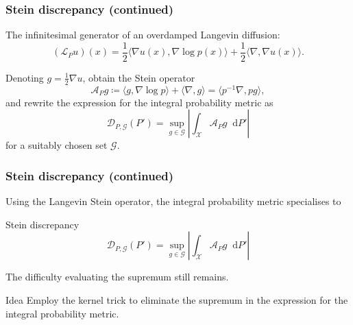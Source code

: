 \documentclass{beamer}
\newcommand*\diff{\mathop{}\!\mathrm{d}}
\begin{document}
\begin{frame}
\frametitle{Stein discrepancy (continued)}

The infinitesimal generator of an overdamped Langevin diffusion:
$$(\mathcal{L}_P u)(x) = \frac{1}{2} \langle \nabla u(x), \nabla \log p(x)\rangle + \frac{1}{2}\langle \nabla, \nabla u(x) \rangle.$$

Denoting $g  = \frac{1}{2}\nabla u$, \cite{gorhamMeasuringSampleQuality2015} obtain the Stein operator
\begin{equation*}
\mathcal{A}_P g \coloneq \langle g, \nabla \log p \rangle + \langle \nabla, g \rangle = \langle p^{-1}\nabla, p g \rangle,
\label{eq:stein-operator}
\end{equation*}
and rewrite the expression for the integral probability metric as
\begin{equation*}
\mathcal{D}_{P, \mathcal{G}}(P') = \sup_{g \in \mathcal{G}}\left|\int_\mathcal{X} \mathcal{A}_P g \diff P' \right|
\label{eq:stein-discrepancy-g}
\end{equation*}
for a suitably chosen set $\mathcal{G}$.

\end{frame}

\begin{frame}
\frametitle{Stein discrepancy (continued)}

Using the Langevin Stein operator, the integral probability metric specialises to
\begin{block}{Stein discrepancy}
\begin{equation*}
\mathcal{D}_{P, \mathcal{G}}(P') = \sup_{g \in \mathcal{G}}\left|\int_\mathcal{X} \mathcal{A}_P g \diff P' \right|
\end{equation*}
\end{block}

The difficulty evaluating the supremum still remains.

\begin{block}{Idea}
Employ the kernel trick to eliminate the supremum in the expression for the integral probability metric.
\end{block}

\end{frame}
\end{document}

